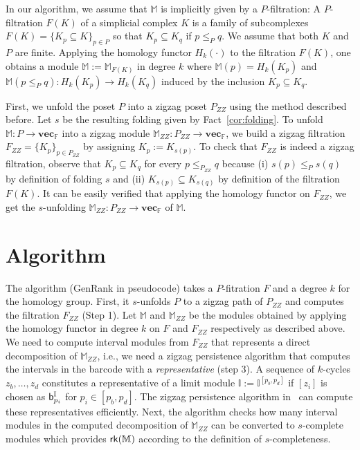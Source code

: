 \documentclass[11pt]{article}
\theoremstyle{plain}%
\newcommand{\Int}{\mathbb{I}}
\newcommand{\vecsp}{\mathbf{vec}_{\mathbb{F}}}
\newcommand{\M}{\mathbb{M}}
\newcommand{\ZZ}{\mathsf{Z}}
\newcommand{\Fld}{\mathrm{Fld}}
\newcommand{\bs}{{\sf b}}
\newcommand{\rk}{{\sf{rk}}}
\begin{document}
In our algorithm, we assume 
that $\M$ is implicitly given by a $P$-filtration:
A $P$-filtration $F(K)$ of a simplicial complex $K$ is a family of
subcomplexes $F(K)=\{K_p\subseteq K\}_{p\in P}$ so that
$K_p \subseteq K_q$ if $p\leq_P q$. We assume that both $K$ and $P$ are finite.
Applying the homology functor $H_k(\cdot)$ to the filtration $F(K)$, one obtains a module $\M:=\M_{F(K)}$
in degree $k$ where $\M(p)=H_k(K_p)$ and $\M(p\leq_P q):H_k(K_p)\rightarrow H_k(K_q)$ induced by the inclusion $K_p\subseteq K_q$. 

First, we unfold the poset $P$ into a zigzag poset $P_{ZZ}$ using the method described
before. Let $s$ be the resulting folding given by
Fact~\ref{cor:folding}. To unfold $\M: P\rightarrow \vecsp$ into a zigzag module $\M_{ZZ}: P_{ZZ}\rightarrow \vecsp$, we build a zigzag filtration $F_{ZZ}=\{K_p\}_{p\in P_{ZZ}}$
by assigning $K_p:=K_{s(p)}$. To check that $F_{ZZ}$ is indeed a zigzag filtration, observe that
$K_p\subseteq K_q$ for every $p\leq_{P_{ZZ}} q$ because (i) $s(p)\leq_P s(q)$ by definition of
folding $s$ and (ii) $K_{s(p)}\subseteq K_{s(q)}$ by definition of the filtration $F(K)$. It can be easily verified that applying the homology functor on 
$F_{ZZ}$, we get the $s$-unfolding $\M_{ZZ}: P_{ZZ}\rightarrow \vecsp$ of
$\M$.


\section{Algorithm}
\label{sec:algorithm}
The algorithm ({\sc GenRank} in pseudocode) takes a $P$-fitration $F$ and
a degree $k$ for the homology group.
First, it $s$-unfolds $P$ to a zigzag path of $P_{ZZ}$ and computes the filtration $F_{ZZ}$ (Step 1).
Let $\M$ and $\M_{ZZ}$ be the modules obtained by applying the
homology functor in degree $k$ on $F$ and $F_{ZZ}$ respectively 
as described above.
We need to compute interval modules from $F_{ZZ}$ that represents
a direct decomposition of $\M_{ZZ}$, i.e., we need a zigzag persistence algorithm that
computes the intervals in the barcode 
with a \emph{representative} (step 3).
A sequence of $k$-cycles $z_b,\ldots,z_d$ constitutes a representative
of a limit module $\Int:=\Int^{[p_b,p_d]}$ if $[z_i]$ is chosen as $\bs^{\Int}_{p_i}$ for $p_i\in [p_b,p_d]$. The zigzag persistence algorithm in~\cite{DHM25} can compute these representatives efficiently.
Next, the algorithm checks how many interval modules in the computed decomposition of $\M_{ZZ}$ can be converted to $s$-complete modules
which provides
$\rk(\M)$ according to the definition of $s$-completeness. 
\end{document}
